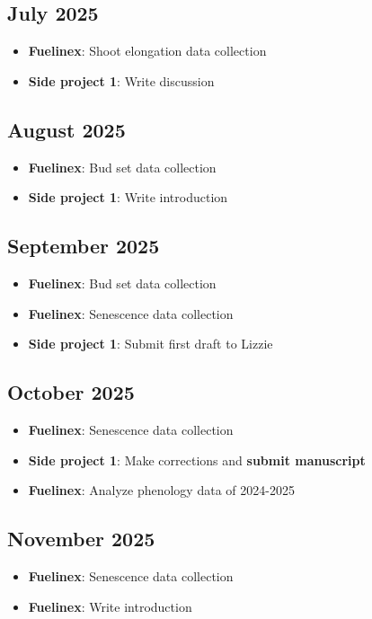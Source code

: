 \documentclass{article}
\begin{document}
\subsection*{July 2025}
\begin{itemize}
    \item \textbf{Fuelinex}: Shoot elongation data collection
    \item \textbf{Side project 1}: Write discussion
\end{itemize}

\subsection*{August 2025}
\begin{itemize}
    \item \textbf{Fuelinex}: Bud set data collection
    \item \textbf{Side project 1}: Write introduction
\end{itemize}

\subsection*{September 2025}
\begin{itemize}
    \item \textbf{Fuelinex}: Bud set data collection
    \item \textbf{Fuelinex}: Senescence data collection
    \item \textbf{Side project 1}: Submit first draft to Lizzie
\end{itemize}

\subsection*{October 2025}
\begin{itemize}
    \item \textbf{Fuelinex}: Senescence data collection
    \item \textbf{Side project 1}: Make corrections and \textbf{submit manuscript}
    \item \textbf{Fuelinex}: Analyze phenology data of 2024-2025
\end{itemize}

\subsection*{November 2025}
\begin{itemize}
    \item \textbf{Fuelinex}: Senescence data collection
    \item \textbf{Fuelinex}: Write introduction
\end{itemize}
\end{document}
